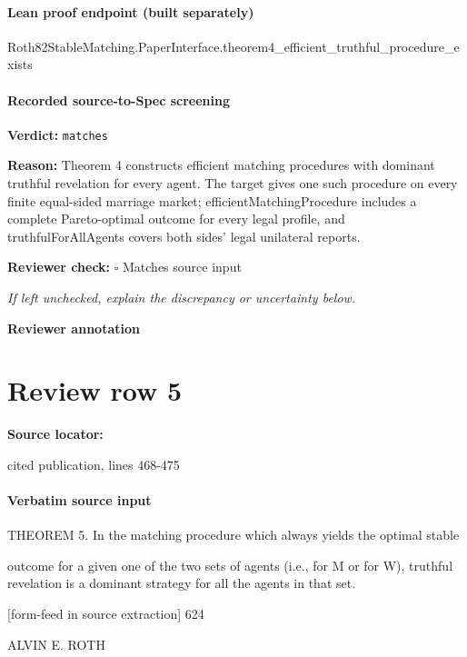 \documentclass[10pt]{article}
\newcommand{\reviewerbox}{%
  \par\noindent\fbox{\parbox{0.96\linewidth}{\rule{0pt}{0.38in}}}\par
}
\newcommand{\reviewmatch}[1]{%
  \par\noindent\textbf{Reviewer check:} $\square$\; #1\par
  \noindent\emph{If left unchecked, explain the discrepancy or uncertainty below.}\par
}
\begin{document}
\paragraph{Lean proof endpoint (built separately)}\begin{ReviewVerbatim}
Roth82StableMatching.PaperInterface.theorem4_efficient_truthful_procedure_exists
\end{ReviewVerbatim}

\paragraph{Recorded source-to-Spec screening}
\textbf{Verdict:} \texttt{matches}
\\
{\raggedright
\textbf{Reason:} Theorem 4 constructs efficient matching procedures with dominant truthful revelation for every agent.\allowbreak{}  The target gives one such procedure on every finite equal-\allowbreak{}sided marriage market;\allowbreak{} efficientMatchingProcedure includes a complete Pareto-\allowbreak{}optimal outcome for every legal profile, and truthfulForAllAgents covers both sides' legal unilateral reports.\allowbreak{}
\par}
\reviewmatch{Matches source input}
\noindent\textbf{Reviewer annotation}\par
\reviewerbox
\clearpage
\hypertarget{source-claim-20d2db0d61f9b81c}{}
\section*{Review row 5}
\textbf{Source locator:} {\footnotesize\raggedright cited publication, lines 468-\allowbreak{}475\par}
\paragraph{Verbatim source input}
\begin{ReviewVerbatim}
THEOREM 5. In the matching procedure which always yields the optimal stable

outcome for a given one of the two sets of agents (i.e., for M or for W), truthful revelation
is a dominant strategy for all the agents in that set.


[form-feed in source extraction]
624

ALVIN E. ROTH
\end{ReviewVerbatim}
\end{document}
